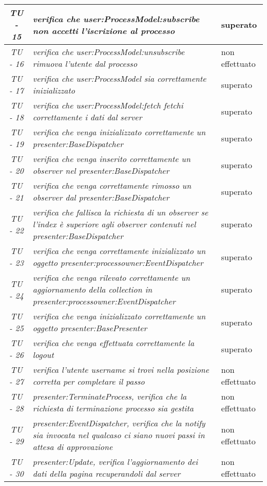 \begin{small}\centering
\begin{tabular}{|c|p{8.0cm}|p{2.0cm}|}
\hline
\textit{TU - 15} &
\textit{verifica che user:ProcessModel:subscribe non accetti l'iscrizione al processo} &  superato\\
\hline
\textit{TU - 16} &
\textit{verifica che user:ProcessModel:unsubscribe rimuova l'utente dal processo} &  non effettuato\\
\hline
\textit{TU - 17} &
\textit{verifica che user:ProcessModel sia correttamente inizializzato} & superato \\
\hline
\textit{TU - 18} &
\textit{verifica che user:ProcessModel:fetch fetchi correttamente i dati dal server } & superato \\
\hline
\textit{TU - 19} &
\textit{verifica che venga inizializzato correttamente un presenter:BaseDispatcher} & superato \\
\hline
\textit{TU - 20} &
\textit{ verifica che venga inserito correttamente un observer nel presenter:BaseDispatcher } & superato \\
\hline
\textit{TU - 21} &
\textit{ verifica che venga correttamente rimosso un observer dal presenter:BaseDispatcher} & superato \\
\hline
\textit{TU - 22} &
\textit{ verifica che fallisca la richiesta di un observer se l'index è superiore agli observer contenuti nel presenter:BaseDispatcher} & superato \\
\hline
\textit{TU - 23} &
\textit{verifica che venga correttamente inizializzato un oggetto presenter:processowner:EventDispatcher } & superato \\
\hline
\textit{TU - 24} &
\textit{verifica che venga rilevato correttamente un aggiornamento della collection in presenter:processowner:EventDispatcher} & superato \\
\hline
\textit{TU - 25} &
\textit{verifica che venga inizializzato correttamente un oggetto presenter:BasePresenter } & superato \\
\hline
\textit{TU - 26} &
\textit{verifica che venga effettuata correttamente la logout } & superato \\
\hline
\textit{TU - 27} &
\textit{verifica l'utente username si trovi nella posizione corretta per completare il passo } & non effettuato \\
\hline
\textit{TU - 28} &
\textit{presenter:TerminateProcess, verifica che la richiesta di terminazione processo sia gestita } & non effettuato \\
\hline
\textit{TU - 29} &
\textit{presenter:EventDispatcher, verifica che la notify sia invocata nel qualcaso ci siano nuovi passi in attesa di approvazione } & non effettuato \\
\hline
\textit{TU - 30} &
\textit{presenter:Update, verifica l'aggiornamento dei dati della pagina recuperandoli dal server} & non effettuato \\
\hline
\end{tabular}\\
\end{small}

